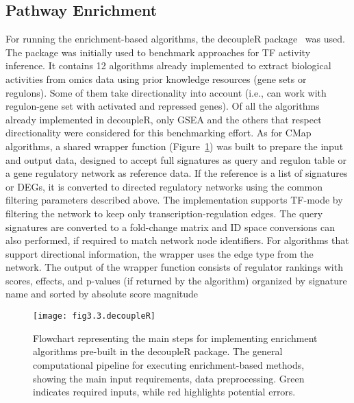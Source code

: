 \subsection{Pathway Enrichment} %
\label{sub:pathwayenrichment}

For running the enrichment-based algorithms, the decoupleR package~\cite{RN35} was used. 
The package was initially used to benchmark approaches for \gls{TF} activity inference. 
It contains 12 algorithms already implemented to extract biological activities from omics data using prior knowledge resources (gene sets or regulons). 
Some of them take directionality into account (i.e., can work with regulon-gene set with activated and repressed genes). 
Of all the algorithms already implemented in decoupleR, only \gls{GSEA} and the others that respect directionality were considered for this benchmarking effort. As for \gls{CMap} algorithms, a shared wrapper function (Figure~\ref{fig:fig3.3.decoupleR}) was built to prepare the input and output data, designed to accept full signatures as query and regulon table or a gene regulatory network as reference data. If the reference is a list of signatures or \gls{DEGs}, it is converted to directed regulatory networks using the common filtering parameters described above. 
The implementation supports \gls{TF}-mode by filtering the network to keep only transcription-regulation edges. 
The query signatures are converted to a fold-change matrix and ID space conversions can also performed, if required to match network node identifiers. 
For algorithms that support directional information, the wrapper uses the edge type from the network.
The output of the wrapper function consists of regulator rankings with scores, effects, and p-values (if returned by the algorithm) organized by signature name and sorted by absolute score magnitude

\begin{figure}[htbp]
    \centering
    \texttt{[image: fig3.3.decoupleR]}
    \caption[Flowchart representing the main steps for implementing enrichment algorithms pre-built in the decoupleR package.]{Flowchart representing the main steps for implementing enrichment algorithms pre-built in the decoupleR package. The general computational pipeline for executing enrichment-based methods, showing the main input requirements, data preprocessing. Green indicates required inputs, while red highlights potential errors.}
    \label{fig:fig3.3.decoupleR}
\end{figure}



